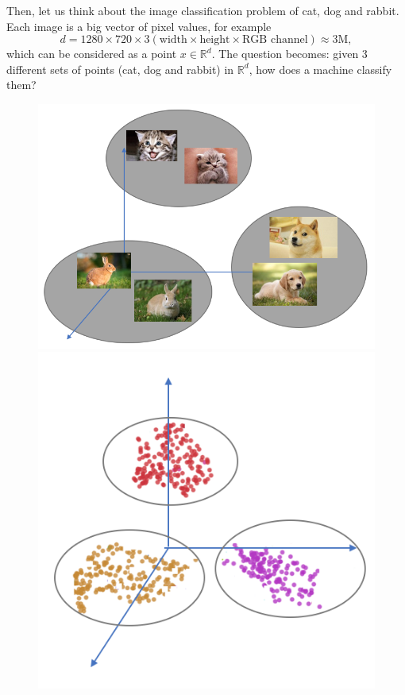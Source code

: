 {	Then, let us think about the image classification problem of cat, dog and rabbit. Each image is a big vector of pixel values, for example
	$$ d=1280\times720\times 3  (\text{width} \times \text{height} \times \text{RGB channel}) \approx 3\text{M},$$
	which can be considered as a point $x \in \mathbb{R}^d$. The question becomes: given 3 different sets of points (cat, dog and rabbit) in $\mathbb{R}^d$, how does a machine classify them?
	\begin{figure}[H]
		\begin{center}
			\includegraphics[width=.3\textwidth, height=.3\textwidth]{figures/cat-dog-2.png}   \quad \quad  \quad \quad
			\includegraphics[width=.3\textwidth, height=.3\textwidth]{figures/cat-dog-3.png}
		\end{center}
	\end{figure}
	
}
